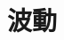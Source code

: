 \documentclass[../../all/physics-standard_questions_all.tex]{subfiles}
\begin{document}
\section{波動}
\end{document}

